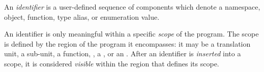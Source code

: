 
\begin{grammar}
\\
\\
 \terminal{::} \\

\exactly\\
\\
 \\

\oneof \\
     
     
 \\
    
     
  \\
     
     
 \\
    
     
  \\
\terminal{\_}\\

\oneof \\
     
   \\

\\
 \\
 \\
\end{grammar}

\specsubitem
An \textit{identifier} is a user-defined sequence of  components
which denote a namespace, object, function, type alias, or enumeration value.

\specsubitem
An identifier is only meaningful within a specific \textit{scope} of the
program. The scope is defined by the region of the program it encompasses: it
may be a translation unit, a sub-unit, a function, , a
, or an . After an identifier
is \textit{inserted} into a scope, it is considered \textit{visible} within the
region that defines its scope.

